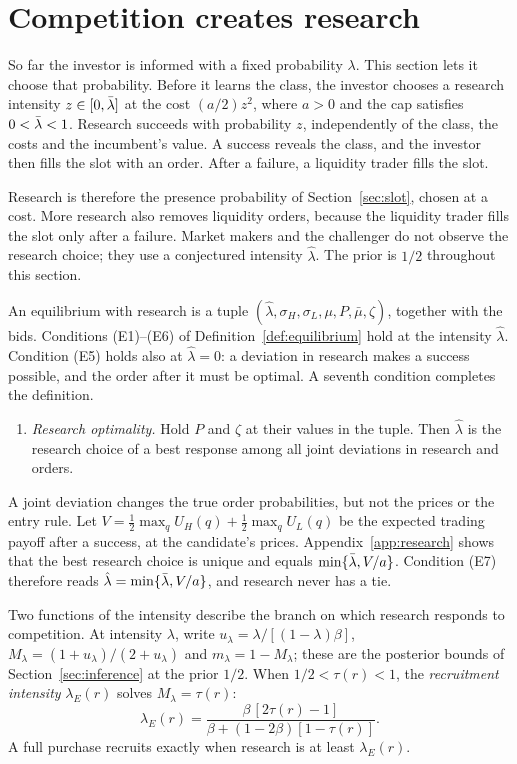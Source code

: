 \section{Competition creates research}\label{sec:research}

So far the investor is informed with a fixed probability \(\lambda\). This section lets it choose that probability.
Before it learns the class, the investor chooses a research intensity \(z\in[0,\bar\lambda]\) at the cost \((a/2)z^2\),
where \(a>0\) and the cap satisfies \(0<\bar\lambda<1\). Research succeeds with probability \(z\), independently of the
class, the costs and the incumbent's value. A success reveals the class, and the investor then fills the slot with
an order. After a failure, a liquidity trader fills the slot.

Research is therefore the presence probability of Section~\ref{sec:slot}, chosen at a cost. More research also
removes liquidity orders, because the liquidity trader fills the slot only after a failure. Market makers and the
challenger do not observe the research choice; they use a conjectured intensity \(\hat\lambda\). The prior is
\(1/2\) throughout this section.

An equilibrium with research is a tuple \((\hat\lambda,\sigma_H,\sigma_L,\mu,P,\bar\mu,\zeta)\), together with the
bids. Conditions (E1)--(E6) of Definition~\ref{def:equilibrium} hold at the intensity \(\hat\lambda\). Condition
(E5) holds also at \(\hat\lambda=0\): a deviation in research makes a success possible, and the order after it must
be optimal. A seventh condition completes the definition.
\begin{enumerate}[label=(E\arabic*),start=7,leftmargin=3em]
\item \emph{Research optimality.} Hold \(P\) and \(\zeta\) at their values in the tuple. Then \(\hat\lambda\) is
the research choice of a best response among all joint deviations in research and orders.
\end{enumerate}
A joint deviation changes the true order probabilities, but not the prices or the entry rule. Let
\(V=\tfrac12\max_qU_H(q)+\tfrac12\max_qU_L(q)\) be the expected trading payoff after a success, at the candidate's
prices. Appendix~\ref{app:research} shows that the best research choice is unique and equals
\(\min\{\bar\lambda,V/a\}\). Condition (E7) therefore reads \(\hat\lambda=\min\{\bar\lambda,V/a\}\), and research never has a tie.

Two functions of the intensity describe the branch on which research responds to competition. At intensity
\(\lambda\), write \(u_\lambda=\lambda/[(1-\lambda)\beta]\), \(M_\lambda=(1+u_\lambda)/(2+u_\lambda)\) and
\(m_\lambda=1-M_\lambda\); these are the posterior bounds of Section~\ref{sec:inference} at the prior \(1/2\). When
\(1/2<\tau(r)<1\), the \emph{recruitment intensity} \(\lambda_E(r)\) solves \(M_\lambda=\tau(r)\):
\[
\lambda_E(r)=\frac{\beta\,[2\tau(r)-1]}{\beta+(1-2\beta)[1-\tau(r)]}.
\]
A full purchase recruits exactly when research is at least \(\lambda_E(r)\).

